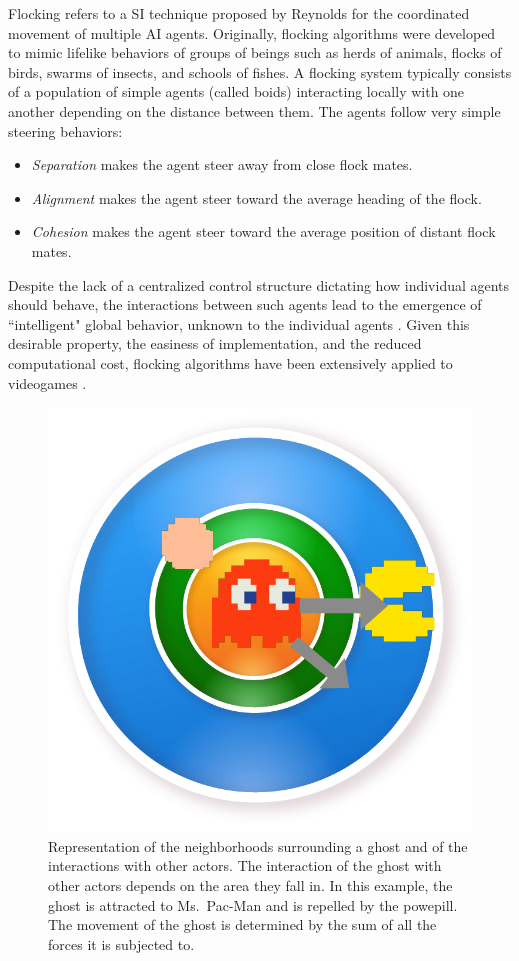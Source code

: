 \documentclass[journal]{IEEEtran}
\begin{document}
Flocking refers to a SI technique proposed by Reynolds \cite{Reynolds87} for the coordinated movement of multiple AI agents. Originally, flocking algorithms were developed to mimic lifelike behaviors of groups of beings such as herds of animals, flocks of birds, swarms of insects, and schools of fishes. A flocking system typically consists of a population of simple agents (called boids) interacting locally with one another depending on the distance between them. The agents follow very simple steering behaviors:

\begin{itemize}
	\item \textit{Separation} makes the agent steer away from close flock mates.
	\item \textit{Alignment} makes the agent steer toward the average heading of the flock.
	\item \textit{Cohesion} makes the agent steer toward the average position of distant flock mates.
\end{itemize} 

Despite the lack of a centralized control structure dictating how
individual agents should behave, the interactions between such agents
lead to the emergence of  ``intelligent" global behavior, unknown to the
individual agents \cite{SpectorEtAl03}. Given this desirable property,
the easiness of implementation, and the reduced computational cost,
flocking algorithms have been extensively applied to videogames
\cite{Scutt02}.

\begin{figure}[!t]
  \label{fig:Neigh_interaction}
  \centering
  \includegraphics[scale=0.5]{"neigh_inter"}
  \caption{Representation of the neighborhoods surrounding a ghost and of the interactions with other actors. The interaction of the ghost with other actors depends on the area they fall in. In this example, the ghost is attracted to Ms.\ Pac-Man and is repelled by the powepill. The movement of the ghost is determined by the sum of all the forces it is subjected to.}
\end{figure}
\end{document}
